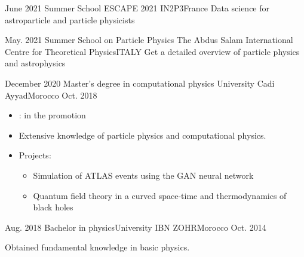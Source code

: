 %
%
%

\begin{experiences}

  \experience
  {June 2021} {Summer School ESCAPE 2021 }{IN2P3}{France}
  {} {Data science for astroparticle and particle physicists}
                  {}   
  \emptySeparator   

  \experience
  {May. 2021} {Summer School on Particle Physics }{The Abdus Salam International Centre for Theoretical Physics}{ITALY}
  {} {Get a detailed overview of particle physics and astrophysics }
                  {}   
  \emptySeparator     

  \experience
  {December 2020} {Master's degree in computational physics }{University Cadi Ayyad}{Morocco}
  {Oct. 2018}  
     {
                      \begin{itemize}
                        \item {:  in the promotion}
                        \item Extensive knowledge of particle physics and computational physics.
                        \item Projects: 
                        \begin{itemize}
                          \item Simulation of ATLAS events using the GAN neural network
                          \item Quantum field theory in a curved space-time and thermodynamics of black holes
                        \end{itemize}
                      \end{itemize}
                    }
                    {}
  \emptySeparator         
  \experience
  {Aug. 2018} {Bachelor in physics}{University IBN ZOHR}{Morocco}
  {Oct. 2014} {
    Obtained fundamental knowledge in basic physics.  
                      
                  }
                  {}  
\end{experiences}



